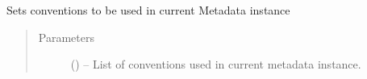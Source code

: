 \documentclass[a4paper,10pt,openany,english]{sphinxmanual}
\begin{document}
\begin{fulllineitems}
\begin{fulllineitems}
\begin{quote}
\begin{description}
\end{description}\end{quote}

\end{fulllineitems}


\begin{fulllineitems}
\label{egadsapi:egads.core.metadata.Metadata.set_conventions}
Sets conventions to be used in current Metadata instance
\begin{quote}\begin{description}
\item[{Parameters}] \leavevmode
{} () -- List of conventions used in current metadata instance.

\end{description}\end{quote}

\end{fulllineitems}


\end{fulllineitems}

\end{document}

